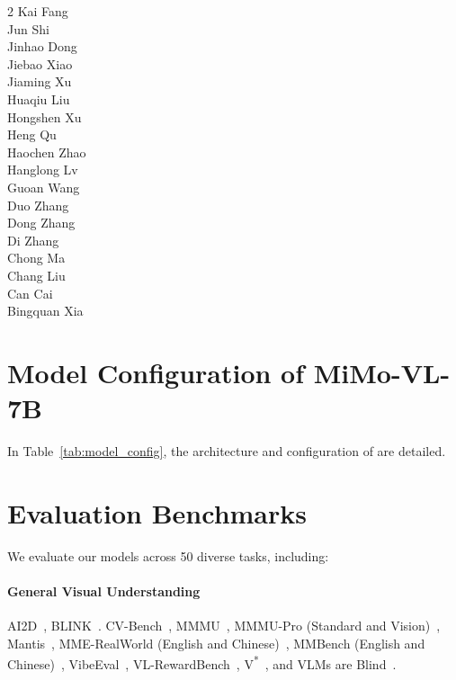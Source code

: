 \begin{multicols}{2}
\color{ourblue} Kai Fang \\
\color{ourblue} Jun Shi \\
\color{ourblue} Jinhao Dong \\
\color{ourblue} Jiebao Xiao \\
\color{ourblue} Jiaming Xu  \\
\color{ourblue} Huaqiu Liu \\
\color{ourblue} Hongshen Xu \\
\color{ourblue} Heng Qu \\
\color{ourblue} Haochen Zhao \\
\color{ourblue} Hanglong Lv \\
\color{ourblue} Guoan Wang \\
\color{ourblue} Duo Zhang \\
\color{ourblue} Dong Zhang \\
\color{ourblue} Di Zhang \\
\color{ourblue} Chong Ma \\
\color{ourblue} Chang Liu \\
\color{ourblue} Can Cai \\
\color{ourblue} Bingquan Xia \\

\end{multicols} %


\section{Model Configuration of MiMo-VL-7B}
\label{sec:model_config}
In Table~\ref{tab:model_config}, the architecture and configuration of \mimovl{} are detailed.


\section{Evaluation Benchmarks}
\label{sec:eval_bench}

We evaluate our models across 50 diverse tasks, including:


\paragraph{General Visual Understanding}
AI2D~\citep{kembhavi2016diagram}, 
BLINK~\citep{fu2024blink}.
CV-Bench~\citep{tong2024cambrian}, 
MMMU~\citep{yue2024mmmu}, 
MMMU-Pro (Standard and Vision)~\citep{yue2024mmmupro}, 
Mantis~\citep{jiang2024mantis},
MME-RealWorld (English and Chinese)~\citep{mmerealworld},
MMBench (English and Chinese)~\citep{liu2024mmbench}, 
VibeEval~\citep{padlewski2024vibe},
VL-RewardBench~\citep{Li2024VLRewardBenchAC},
V\textsuperscript{*}~\citep{wu2023vguidedvisualsearch}, 
and VLMs are Blind~\citep{rahmanzadehgervi2025visionlanguagemodelsblind}. 


